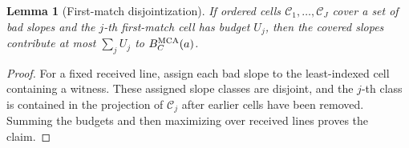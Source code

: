\documentclass[11pt,a4paper]{amsart}
\numberwithin{equation}{section}
\newtheorem{lemma}[theorem]{Lemma}
\theoremstyle{remark}
\newcommand{\Ccal}{\mathcal C}
\begin{document}
\begin{lemma}[First-match disjointization]\label{lem:first-match}
If ordered cells \(\Ccal_1,\ldots,\Ccal_J\) cover a set of bad slopes and the \(j\)-th first-match cell has budget \(U_j\), then the covered slopes contribute at most \(\sum_jU_j\) to \(B_C^{\rm MCA}(a)\).
\end{lemma}

\begin{proof}
For a fixed received line, assign each bad slope to the least-indexed cell containing a witness.  These assigned slope classes are disjoint, and the \(j\)-th class is contained in the projection of \(\Ccal_j\) after earlier cells have been removed.  Summing the budgets and then maximizing over received lines proves the claim.
\end{proof}
\end{document}
